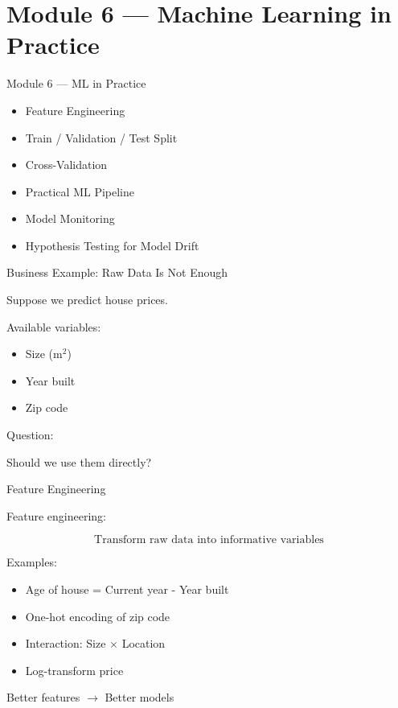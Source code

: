 \documentclass{beamer}
\begin{document}
\section{Module 6 — Machine Learning in Practice}

\begin{frame}{Module 6 — ML in Practice}
\begin{itemize}
    \item Feature Engineering
    \item Train / Validation / Test Split
    \item Cross-Validation
    \item Practical ML Pipeline
    \item Model Monitoring
    \item Hypothesis Testing for Model Drift
\end{itemize}
\end{frame}

\begin{frame}{Business Example: Raw Data Is Not Enough}

Suppose we predict house prices.

Available variables:

\begin{itemize}
    \item Size (m$^2$)
    \item Year built
    \item Zip code
\end{itemize}

\vspace{0.5cm}

Question:

Should we use them directly?

\end{frame}

\begin{frame}{Feature Engineering}

Feature engineering:

\[
\text{Transform raw data into informative variables}
\]

\vspace{0.5cm}

Examples:

\begin{itemize}
    \item Age of house = Current year - Year built
    \item One-hot encoding of zip code
    \item Interaction: Size $\times$ Location
    \item Log-transform price
\end{itemize}

\vspace{0.5cm}

Better features $\rightarrow$ Better models

\end{frame}
\end{document}
